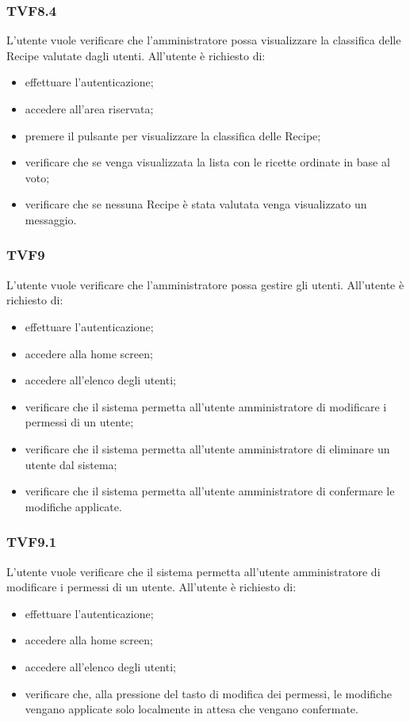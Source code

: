 		\subsubsection{TVF8.4}
			L'utente vuole verificare che l'amministratore possa visualizzare la classifica delle Recipe valutate dagli utenti. All'utente è richiesto di:
			\begin{itemize}
				\item effettuare l'autenticazione;
				\item accedere all'area riservata;
				\item premere il pulsante per visualizzare la classifica delle Recipe;
				\item verificare che se venga visualizzata la lista con le ricette ordinate in base al voto;
				\item verificare che se nessuna Recipe è stata valutata venga visualizzato un messaggio.
			\end{itemize}
			
		\subsubsection{TVF9}
			L'utente vuole verificare che l'amministratore possa gestire gli utenti. All'utente è richiesto di:
			\begin{itemize}
				\item effettuare l'autenticazione;
				\item accedere alla home screen;
				\item accedere all'elenco degli utenti;
				\item verificare che il sistema permetta all'utente amministratore di modificare i permessi di un utente;
				\item verificare che il sistema permetta all'utente amministratore di eliminare un utente dal sistema;
				\item verificare che il sistema permetta all'utente amministratore di confermare le modifiche applicate.
			\end{itemize}
			
		\subsubsection{TVF9.1}
			L'utente vuole verificare che il sistema permetta all'utente amministratore di modificare i permessi di un utente. All'utente è richiesto di:
			\begin{itemize}
				\item effettuare l'autenticazione;
				\item accedere alla home screen;
				\item accedere all'elenco degli utenti;
				\item verificare che, alla pressione del tasto di modifica dei permessi, le modifiche vengano applicate solo localmente in attesa che vengano confermate.
			\end{itemize}
			
